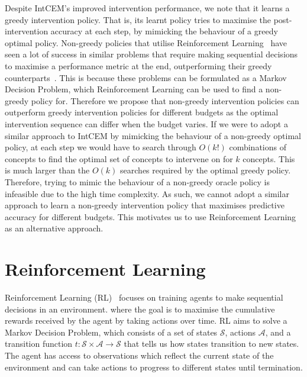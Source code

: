 Despite IntCEM's improved intervention performance,
we note that it learns a greedy intervention policy.
That is, its learnt policy tries to maximise the 
post-intervention accuracy at each step, 
by mimicking the behaviour of a greedy optimal policy. 
Non-greedy policies that utilise
Reinforcement Learning~\cite{rl} have seen a lot of
success in similar problems that require
making sequential decisions to maximise a performance metric at the end,
outperforming their
greedy counterparts~\cite{non-greedy-3, gsmrl, non-greedy-2, non-greedy-1}.
This is because these problems can be formulated as a Markov Decision Problem,
which Reinforcement Learning can be used to find a non-greedy policy for.
Therefore we propose that
non-greedy intervention policies can outperform greedy intervention policies
for different budgets as the optimal intervention sequence can differ when the budget
varies. 
If we were to adopt a similar approach to IntCEM by mimicking the behaviour of a 
non-greedy optimal policy,
at each step we would have to search through
$O(k!)$ combinations of concepts
to find the optimal set of concepts to intervene on for 
$k$ concepts. This is much larger
than the $O(k)$ searches required by the optimal greedy policy.
Therefore, trying to mimic the behaviour of a non-greedy oracle policy is infeasible due to the high time complexity.
As such, we cannot adopt a similar approach to learn a non-greedy intervention policy that maximises predictive accuracy for different budgets.
This motivates us to use Reinforcement Learning as an alternative approach.

\section{Reinforcement Learning}\label{background:rl} %
Reinforcement Learning (RL)~\cite{rl} focuses on
 training agents to make sequential decisions in an environment.
where the goal is to maximise the cumulative rewards received by the agent
by taking actions over time. 
RL aims to solve a Markov Decision Problem, which consists of a set of states $\mathcal{S}$, 
actions $\mathcal{A}$, and 
a transition function $t: \mathcal{S} \times \mathcal{A} \to \mathcal{S}$
that tells us how states transition to new states.
The agent has access to observations which reflect the current state
 of the environment and can take actions to progress to different states until termination.

